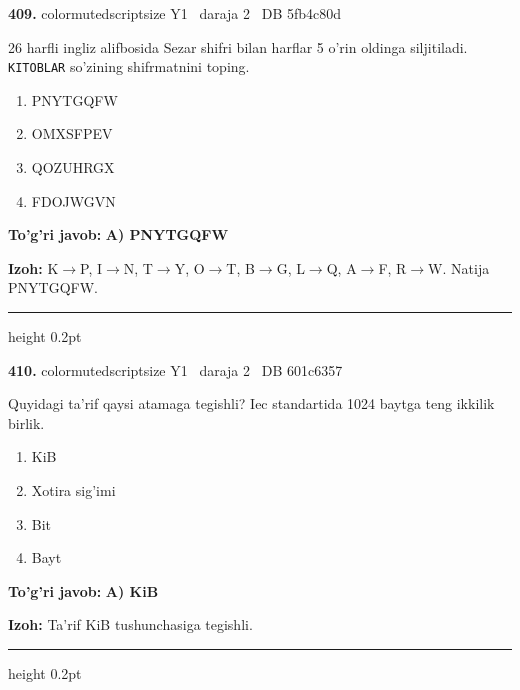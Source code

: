 \documentclass[10pt,a4paper,oneside]{article}
\begin{document}
\noindent\textbf{\color{ink}409.}  {color{muted}scriptsize Y1 \textbullet\ daraja 2 \textbullet\ DB 5fb4c80d}
\par
26 harfli ingliz alifbosida Sezar shifri bilan harflar 5 o'rin oldinga siljitiladi. \texttt{KITOBLAR} so'zining shifrmatnini toping.
\begin{enumerate}[label=\Alph*),leftmargin=9mm]
\item PNYTGQFW
\item OMXSFPEV
\item QOZUHRGX
\item FDOJWGVN
\end{enumerate}
\begin{tcolorbox}[enhanced,breakable,colback=teal!4,colframe=teal!50!black,boxrule=0.5pt,arc=1.1mm,left=3mm,right=3mm,top=1.7mm,bottom=1.7mm,before skip=2mm,after skip=2mm]
\textbf{\color{teal}To'g'ri javob:} \textbf{A) PNYTGQFW}
\par\smallskip
\textbf{Izoh:} K\ensuremath{\to}P, I\ensuremath{\to}N, T\ensuremath{\to}Y, O\ensuremath{\to}T, B\ensuremath{\to}G, L\ensuremath{\to}Q, A\ensuremath{\to}F, R\ensuremath{\to}W. Natija PNYTGQFW.
\end{tcolorbox}
\vspace{2mm}\hrule height 0.2pt \vspace{3mm}

\noindent\textbf{\color{ink}410.}  {color{muted}scriptsize Y1 \textbullet\ daraja 2 \textbullet\ DB 601c6357}
\par
Quyidagi ta'rif qaysi atamaga tegishli? Iec standartida 1024 baytga teng ikkilik birlik.
\begin{enumerate}[label=\Alph*),leftmargin=9mm]
\item KiB
\item Xotira sig'imi
\item Bit
\item Bayt
\end{enumerate}
\begin{tcolorbox}[enhanced,breakable,colback=teal!4,colframe=teal!50!black,boxrule=0.5pt,arc=1.1mm,left=3mm,right=3mm,top=1.7mm,bottom=1.7mm,before skip=2mm,after skip=2mm]
\textbf{\color{teal}To'g'ri javob:} \textbf{A) KiB}
\par\smallskip
\textbf{Izoh:} Ta'rif KiB tushunchasiga tegishli.
\end{tcolorbox}
\vspace{2mm}\hrule height 0.2pt \vspace{3mm}
\end{document}
